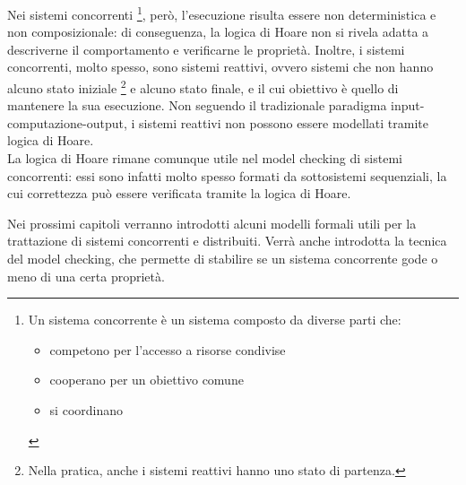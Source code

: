 Nei sistemi concorrenti
\footnote{Un sistema concorrente è un sistema composto da diverse parti che:
\begin{itemize}
    \item competono per l'accesso a risorse condivise
    \item cooperano per un obiettivo comune
    \item si coordinano
\end{itemize}}, però, l'esecuzione risulta essere non deterministica
e non composizionale: di conseguenza, la logica di Hoare non si
rivela adatta a descriverne il comportamento e verificarne le proprietà.
Inoltre, i sistemi concorrenti, molto spesso, sono sistemi reattivi,
ovvero sistemi che non hanno alcuno stato iniziale
\footnote{Nella pratica, anche i sistemi reattivi hanno uno stato di
partenza.} e alcuno stato finale, e il cui obiettivo è quello di mantenere
la sua esecuzione. Non seguendo il tradizionale paradigma
input-computazione-output, i sistemi reattivi non possono essere modellati
tramite logica di Hoare.\\
La logica di Hoare rimane comunque utile nel model checking di sistemi
concorrenti: essi sono infatti molto spesso formati da sottosistemi
sequenziali, la cui correttezza può essere verificata tramite la logica
di Hoare.

Nei prossimi capitoli verranno introdotti alcuni modelli formali
utili per la trattazione di sistemi concorrenti e
distribuiti. Verrà anche introdotta la tecnica del model checking, che
permette di stabilire se un sistema concorrente gode o meno di una
certa proprietà.
